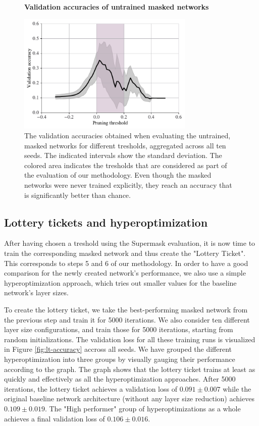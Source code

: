 \documentclass[12pt,final,twoside]{article}
\theoremstyle{plain}
\theoremstyle{definition}
\theoremstyle{remark}
\theoremstyle{named}
\begin{document}
\begin{figure}[h]
  \centering
  \textbf{Validation accuracies of untrained masked networks}\par\medskip
  \includegraphics[width=0.75\textwidth]{plots/pruned_accuracies.pdf}
  \caption{The validation accuracies obtained when evaluating the untrained, masked networks for different tresholds, aggregated across all ten seeds. The indicated intervals show the standard deviation. The colored area indicates the tresholds that are considered as part of the evaluation of our methodology. Even though the masked networks were never trained explicitly, they reach an accuracy that is significantly better than chance.}
  \label{fig:pruned-accuracies}
\end{figure}

\subsection{Lottery tickets and hyperoptimization}
After having chosen a treshold using the Supermask evaluation, it is now time to train the corresponding masked network and thus create the "Lottery Ticket". This corresponds to steps 5 and 6 of our methodology. In order to have a good comparison for the newly created network's performance, we also use a simple hyperoptimization approach, which tries out smaller values for the baseline network's layer sizes.

To create the lottery ticket, we take the best-performing masked network from the previous step and train it for 5000 iterations. We also consider ten different layer size configurations, and train those for 5000 iterations, starting from random initializations. The validation loss for all these training runs is visualized in Figure \ref{fig:lt-accuracy} accross all seeds. We have grouped the different hyperoptimization into three groups by visually gauging their performance according to the graph. The graph shows that the lottery ticket trains at least as quickly and effectively as all the hyperoptimization approaches. After 5000 iterations, the lottery ticket achieves a validation loss of $0.091 \pm 0.007$ while the original baseline network architecture (without any layer size reduction) achieves $0.109 \pm 0.019$. The "High performer" group of hyperoptimizations as a whole achieves a final validation loss of $0.106 \pm 0.016$.
\end{document}
